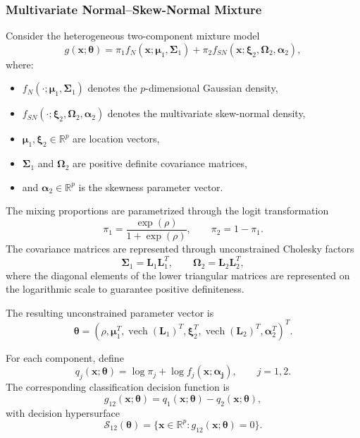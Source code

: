 \documentclass[pdflatex,sn-mathphys-ay]{sn-jnl}%
\newcommand{\vech}{\operatorname{vech}}
\let\oldtheta\theta
\renewcommand{\theta}{\boldsymbol{\oldtheta}}
\let\oldalpha\alpha
\renewcommand{\alpha}{\boldsymbol{\oldalpha}}
\let\oldmu\mu
\renewcommand{\mu}{\boldsymbol{\oldmu}}
\let\oldSigma\Sigma
\renewcommand{\Sigma}{\boldsymbol{\oldSigma}}
\let\oldxi\xi
\renewcommand{\xi}{\boldsymbol{\oldxi}}
\let\oldOmega\Omega
\renewcommand{\Omega}{\boldsymbol{\oldOmega}}
\theoremstyle{thmstyleone}%
\theoremstyle{thmstyletwo}%
\theoremstyle{thmstylethree}%
\begin{document}
\subsubsection{Multivariate Normal--Skew-Normal Mixture}

Consider the heterogeneous two-component mixture model
\[
    g(\mathbf{x};\boldsymbol{\theta})
    =
    \pi_1
    f_N(\mathbf{x};\boldsymbol{\mu}_1,\boldsymbol{\Sigma}_1)
    +
    \pi_2
    f_{SN}(\mathbf{x};\boldsymbol{\xi}_2,\boldsymbol{\Omega}_2,\boldsymbol{\alpha}_2),
\]
where:
\begin{itemize}
    \item $f_N(\cdot;\boldsymbol{\mu}_1,\boldsymbol{\Sigma}_1)$ denotes the $p$-dimensional Gaussian density,
    \item $f_{SN}(\cdot;\boldsymbol{\xi}_2,\boldsymbol{\Omega}_2,\boldsymbol{\alpha}_2)$ denotes the multivariate skew-normal density,
    \item $\boldsymbol{\mu}_1,\boldsymbol{\xi}_2\in\mathbb R^p$ are location vectors,
    \item $\boldsymbol{\Sigma}_1$ and $\boldsymbol{\Omega}_2$ are positive definite covariance matrices,
    \item and $\boldsymbol{\alpha}_2\in\mathbb R^p$ is the skewness parameter vector.
\end{itemize}

The mixing proportions are parametrized through the logit transformation
\[
    \pi_1
    =
    \frac{\exp(\rho)}
    {1+\exp(\rho)},
    \qquad
    \pi_2
    =
    1-\pi_1.
\]
The covariance matrices are represented through unconstrained Cholesky factors
\[
    \boldsymbol{\Sigma}_1=\mathbf{L}_1\mathbf{L}_1^T,
    \qquad
    \boldsymbol{\Omega}_2=\mathbf{L}_2\mathbf{L}_2^T,
\]
where the diagonal elements of the lower triangular matrices are represented on the logarithmic scale to guarantee positive definiteness.

The resulting unconstrained parameter vector is
\[
    \boldsymbol{\theta}
    =
    (
    \rho,
    \boldsymbol{\mu}_1^T,
    \vech(\mathbf{L}_1)^T,
    \boldsymbol{\xi}_2^T,
    \vech(\mathbf{L}_2)^T,
    \boldsymbol{\alpha}_2^T
    )^T.
\]

For each component, define
\[
    q_j(\mathbf{x}; \boldsymbol{\theta})
    =
    \log \pi_j
    +
    \log f_j(\mathbf{x}; \boldsymbol{\alpha_j}),
    \qquad j=1,2.
\]
The corresponding classification decision function is
\[
    g_{12}(\mathbf{x}; \boldsymbol{\theta})
    =
    q_1(\mathbf{x}; \boldsymbol{\theta})
    -
    q_2(\mathbf{x}; \boldsymbol{\theta}),
\]
with decision hypersurface
\[
    \mathcal S_{12}( \boldsymbol{\theta})
    =
    \{\mathbf{x}\in\mathbb R^p:
    g_{12}(\mathbf{x}; \boldsymbol{\theta})=0\}.
\]
\end{document}
